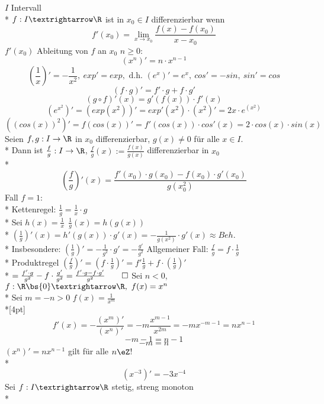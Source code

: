 %
\wdh
$I$ Intervall\\*
$f:I→\R$ ist in $x_0\in I$ differenzierbar wenn $$f'(x_0)=\lim_{x→x_0}\frac{f(x)-f(x_0)}{x-x_0}$$
$f'(x_0)$ Ableitung von $f$ an $x_0$
\bsp
$n\geq 0:$ $$(x^n)'=n·x^{n-1}$$
$$(\frac{1}{x})'=-\frac{1}{x^2},\ exp'=exp,\text{ d.h. }(e^x)'=e^x,\ cos'=-sin,\ sin'=cos$$
$$(f·g)'=f'·g+f·g'$$
$$(g\circ f)'(x)=g'(f(x))·f'(x)$$
\bsp
$$(e^{x^2})'=(exp(x^2))'=exp'(x^2)·(x^2)'=2x·e^(x^2)$$
$((cos (x))^2)' = f(cos (x))' = f'(cos (x)) \cdot cos'(x) = 2 \cdot cos(x) \cdot sin(x)$
Seien $f, g: I \to \R$ in $x_0$ differenzierbar, $g(x) \neq 0$ für alle $x \in I$.\\*
Dann ist $\frac{f}{g}: I \to \R$, $\frac{f}{g}(x) := \frac{f(x)}{g(x)}$ differenzierbar in $x_0$\\*
$$(\frac{f}{g})'(x) = \frac{f'(x_0)\cdot g(x_0) - f(x_0) \cdot g'(x_0)}{g(x_0^2)}$$
\bew
Fall $f = 1$:\\*
Kettenregel:
$\frac{1}{g} = \frac{1}{x} \cdot g$\\*
Sei $h(x) = \frac{1}{x}\ \ \frac{1}{g}(x) = h(g(x))$ \\*
$(\frac{1}{g})'(x) = h'(g(x)) \cdot g'(x) = - \frac{1}{g(x^2)} \cdot g'(x) \approx Beh.$\\*
Insbesondere: $(\frac{1}{g})' = -\frac{1}{g^2} \cdot g' = -\frac{g'}{g^2}$
Allgemeiner Fall:
$\frac{f}{g} = f \cdot \frac{1}{g}$\\*
Produktregel \Rarr{} $(\frac{f}{g})' = (f \cdot \frac{1}{g})' = f'\frac{1}{g} + f \cdot (\frac{1}{g})'$\\*
$= \frac{f' \cdot g}{g^2} - f\cdot \frac{g'}{g^2} = \frac{f'\cdot g - f \cdot g'}{g^2} \qed$
\bsp
Sei $n<0$, $f:\R\bs\{0\}→\R,\ f(x)=x^n$\\*
Sei $m=-n>0$ $f(x)=\frac{1}{x^m}$\\*[4pt]
$$f'(x)=-\frac{(x^m)'}{(x^n)'}=-m\frac{x^{m-1}}{x^{2m}}=-mx^{-m-1}=nx^{n-1}$$
$$-m-1=n-1$$ $$-m=n$$
$(x^n)'=nx^{n-1}$ gilt für alle $n\eZ$!\\*
$$(x^{-3})'=-3x^{-4}$$
Sei $f:I→\R$ stetig, streng monoton\\*
